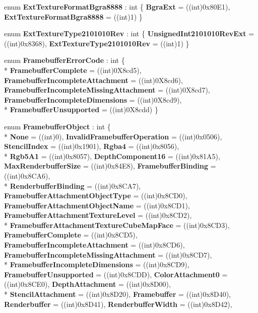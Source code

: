 \begin{DoxyCompactItemize}
enum {\bfseries Ext\-Texture\-Format\-Bgra8888} \-: int \{ {\bfseries Bgra\-Ext} = ((int)0x80\-E1), 
{\bfseries Ext\-Texture\-Format\-Bgra8888} = ((int)1)
 \}
\item 
enum {\bfseries Ext\-Texture\-Type2101010\-Rev} \-: int \{ {\bfseries Unsigned\-Int2101010\-Rev\-Ext} = ((int)0x8368), 
{\bfseries Ext\-Texture\-Type2101010\-Rev} = ((int)1)
 \}
\item 
enum {\bfseries Framebuffer\-Error\-Code} \-: int \{ \\*
{\bfseries Framebuffer\-Complete} = ((int)0\-X8cd5), 
{\bfseries Framebuffer\-Incomplete\-Attachment} = ((int)0\-X8cd6), 
{\bfseries Framebuffer\-Incomplete\-Missing\-Attachment} = ((int)0\-X8cd7), 
{\bfseries Framebuffer\-Incomplete\-Dimensions} = ((int)0\-X8cd9), 
\\*
{\bfseries Framebuffer\-Unsupported} = ((int)0\-X8cdd)
 \}
\item 
enum {\bfseries Framebuffer\-Object} \-: int \{ \\*
{\bfseries None} = ((int)0), 
{\bfseries Invalid\-Framebuffer\-Operation} = ((int)0x0506), 
{\bfseries Stencil\-Index} = ((int)0x1901), 
{\bfseries Rgba4} = ((int)0x8056), 
\\*
{\bfseries Rgb5\-A1} = ((int)0x8057), 
{\bfseries Depth\-Component16} = ((int)0x81\-A5), 
{\bfseries Max\-Renderbuffer\-Size} = ((int)0x84\-E8), 
{\bfseries Framebuffer\-Binding} = ((int)0x8\-C\-A6), 
\\*
{\bfseries Renderbuffer\-Binding} = ((int)0x8\-C\-A7), 
{\bfseries Framebuffer\-Attachment\-Object\-Type} = ((int)0x8\-C\-D0), 
{\bfseries Framebuffer\-Attachment\-Object\-Name} = ((int)0x8\-C\-D1), 
{\bfseries Framebuffer\-Attachment\-Texture\-Level} = ((int)0x8\-C\-D2), 
\\*
{\bfseries Framebuffer\-Attachment\-Texture\-Cube\-Map\-Face} = ((int)0x8\-C\-D3), 
{\bfseries Framebuffer\-Complete} = ((int)0x8\-C\-D5), 
{\bfseries Framebuffer\-Incomplete\-Attachment} = ((int)0x8\-C\-D6), 
{\bfseries Framebuffer\-Incomplete\-Missing\-Attachment} = ((int)0x8\-C\-D7), 
\\*
{\bfseries Framebuffer\-Incomplete\-Dimensions} = ((int)0x8\-C\-D9), 
{\bfseries Framebuffer\-Unsupported} = ((int)0x8\-C\-D\-D), 
{\bfseries Color\-Attachment0} = ((int)0x8\-C\-E0), 
{\bfseries Depth\-Attachment} = ((int)0x8\-D00), 
\\*
{\bfseries Stencil\-Attachment} = ((int)0x8\-D20), 
{\bfseries Framebuffer} = ((int)0x8\-D40), 
{\bfseries Renderbuffer} = ((int)0x8\-D41), 
{\bfseries Renderbuffer\-Width} = ((int)0x8\-D42), 

\end{DoxyCompactItemize}
